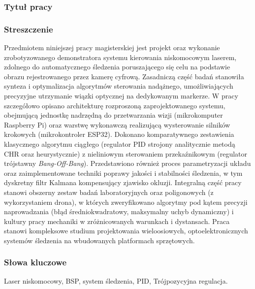 \documentclass[a4paper,twoside,12pt]{book}
\begin{document}


\cleardoublepage

\rmfamily\normalfont
\pagestyle{empty}



\subsubsection*{Tytuł pracy} 
\Title

\subsubsection*{Streszczenie}

Przedmiotem niniejszej pracy magisterskiej jest projekt oraz wykonanie zrobotyzowanego demonstratora systemu kierowania niskomocowym laserem, zdolnego do automatycznego śledzenia poruszającego się celu na podstawie obrazu rejestrowanego przez kamerę cyfrową. Zasadniczą część badań stanowiła synteza i optymalizacja algorytmów sterowania nadążnego, umożliwiających precyzyjne utrzymanie wiązki optycznej na dedykowanym markerze. W pracy szczegółowo opisano architekturę rozproszoną zaprojektowanego systemu, obejmującą jednostkę nadrzędną do przetwarzania wizji (mikrokomputer Raspberry Pi) oraz warstwę wykonawczą realizującą wysterowanie silników krokowych (mikrokontroler ESP32). Dokonano komparatywnego zestawienia klasycznego algorytmu ciągłego (regulator PID strojony analitycznie metodą CHR oraz heurystycznie) z nieliniowym sterowaniem przekaźnikowym (regulator trójstawny \textit{Bang-Off-Bang}). Przedstawiono również proces parametryzacji układu oraz zaimplementowane techniki poprawy jakości i stabilności śledzenia, w tym dyskretny filtr Kalmana kompensujący zjawisko okluzji. Integralną część pracy stanowi obszerny zestaw badań laboratoryjnych oraz poligonowych (z wykorzystaniem drona), w których zweryfikowano algorytmy pod kątem precyzji naprowadzania (błąd średniokwadratowy, maksymalny uchyb dynamiczny) i kultury pracy mechaniki w zróżnicowanych warunkach i dystansach. Praca stanowi kompleksowe studium projektowania wieloosiowych, optoelektronicznych systemów śledzenia na wbudowanych platformach sprzętowych.

\subsubsection*{Słowa kluczowe} 
Laser niskomocowy, BSP, system śledzenia, PID, Trójpozycyjna regulacja.
\end{document}
